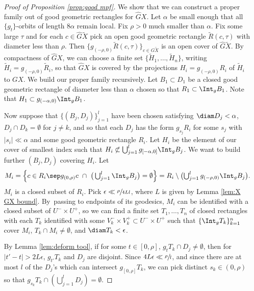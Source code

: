 \begin{proof}[Proof of Proposition \ref{prop:good mpf}]
We show that we can construct a proper family out of good geometric rectangles for $\hat G X$.
Let $\alpha$ be small enough that all $\{g_t\}$-orbits of length $8\alpha$ remain local. Fix $\rho>0$ much smaller than $\alpha$. Fix some large $\tau$ and for each $c \in \hat G\tilde X$ pick an open good geometric rectangle $\tilde R(c,\tau)$ with diameter less than $\rho$. Then $\{ g_{(-\rho,0)} \tilde R(c, \tau)\}_{c\in G\tilde X}$ is an open cover of $\hat G\tilde X$. By compactness of $\hat GX$, we can choose a finite set $\{ \tilde H_1, \ldots, \tilde H_n\}$, writing $\tilde H_i = g_{(-\rho,0)}\tilde R_i$, so that $\hat GX$ is covered by the projections $H_i= g_{(-\rho,0)} R_i$ of $\tilde H_i$ to $GX$. We build our proper family recursively. Let $B_1 \subset D_1$ be a closed good geometric rectangle of diameter less than $\alpha$ chosen so that $R_1 \subset \Int_g B_1$. Note that $H_1 \subset g_{(-\alpha,0)} \Int_g B_1$.

Now suppose that $\{ (B_j, D_j) \}_{j=1}^l$ have been chosen satisfying $\diam D_j < \alpha$, \hbox{$D_j \cap D_k = \emptyset$} for $j\neq k$, and so that each $D_j$ has the form $g_{s_j}R_i$ for some $s_j$ with $|s_i| \ll  \alpha$ and some good geometric rectangle $R_i$. Let $H_i$ be the element of our cover of smallest index such that $H_i \not\subset \bigcup_{j=1}^l g_{[-\alpha,0]} \Int_g B_j$.
We want to build further $(B_j, D_j)$ covering $H_i$. Let\vspace*{-3pt}\enlargethispage{\baselineskip}%
\[\textstyle
M_i = \left\{ c\in R_i \sep g_{(0,\rho)} c \ \cap \ \big(\bigcup_{j=1}^l \Int_g B_j\big) = \emptyset \right\}
= R_i \setminus \bigl( \bigcup_{j=1}^l g_{(-\rho,0)} \Int_g B_j \bigr).
\]
$M_i$ is a closed subset of $R_i$. Pick $\epsilon \ll  \sfrac{\rho}{4Ll}$, where $L$ is given by Lemma \ref{lem:X GX bound}. By~passing to endpoints of its geodesics, $M_i$ can be identified with a closed subset of $U^-\times U^+$, so we can find a finite set $T_1, \ldots, T_n$ of closed rectangles with each $T_k$ identified with some $V_k^-\times V_k^+ \subset U^-\times U^+$ such that $\{ \Int_g T_k\}_{k=1}^n$ cover $M_i$, $T_k \cap M_i \neq \emptyset$, and $\diam T_k < \epsilon$.

By Lemma \ref{lem:deform tool}, if for some $t\in [0,\rho]$, $g_tT_k \cap D_j \neq \emptyset$, then for $|t'-t|>2L\epsilon$, $g_{t'}T_k$ and $D_j$ are disjoint. Since $4L\epsilon \ll  \sfrac{\rho}{l}$, and since there are at most $l$ of the $D_j$'s which can intersect $g_{[0,\rho]}T_k$, we can pick distinct $s_k \in (0, \rho)$ so that $g_{s_k} T_k \cap ( \bigcup _{j=1}^l D_j ) = \emptyset$.


\end{proof}
